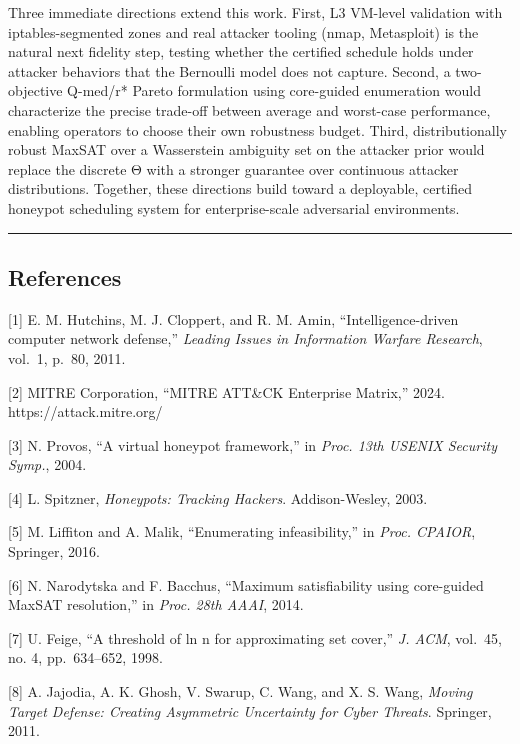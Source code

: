 \documentclass[
  11pt,
]{article}
\begin{document}
Three immediate directions extend this work. First, L3 VM-level
validation with iptables-segmented zones and real attacker tooling
(nmap, Metasploit) is the natural next fidelity step, testing whether
the certified schedule holds under attacker behaviors that the Bernoulli
model does not capture. Second, a two-objective Q-med/r* Pareto
formulation using core-guided enumeration would characterize the precise
trade-off between average and worst-case performance, enabling operators
to choose their own robustness budget. Third, distributionally robust
MaxSAT over a Wasserstein ambiguity set on the attacker prior would
replace the discrete Θ with a stronger guarantee over continuous
attacker distributions. Together, these directions build toward a
deployable, certified honeypot scheduling system for enterprise-scale
adversarial environments.

\begin{center}\rule{0.5\linewidth}{0.5pt}\end{center}

\hypertarget{references}{%
\subsection{References}\label{references}}

{[}1{]} E. M. Hutchins, M. J. Cloppert, and R. M. Amin,
``Intelligence-driven computer network defense,'' \emph{Leading Issues
in Information Warfare Research}, vol.~1, p.~80, 2011.

{[}2{]} MITRE Corporation, ``MITRE ATT\&CK Enterprise Matrix,'' 2024.
https://attack.mitre.org/

{[}3{]} N. Provos, ``A virtual honeypot framework,'' in \emph{Proc. 13th
USENIX Security Symp.}, 2004.

{[}4{]} L. Spitzner, \emph{Honeypots: Tracking Hackers}. Addison-Wesley,
2003.

{[}5{]} M. Liffiton and A. Malik, ``Enumerating infeasibility,'' in
\emph{Proc. CPAIOR}, Springer, 2016.

{[}6{]} N. Narodytska and F. Bacchus, ``Maximum satisfiability using
core-guided MaxSAT resolution,'' in \emph{Proc. 28th AAAI}, 2014.

{[}7{]} U. Feige, ``A threshold of ln n for approximating set cover,''
\emph{J. ACM}, vol.~45, no. 4, pp.~634--652, 1998.

{[}8{]} A. Jajodia, A. K. Ghosh, V. Swarup, C. Wang, and X. S. Wang,
\emph{Moving Target Defense: Creating Asymmetric Uncertainty for Cyber
Threats}. Springer, 2011.
\end{document}

